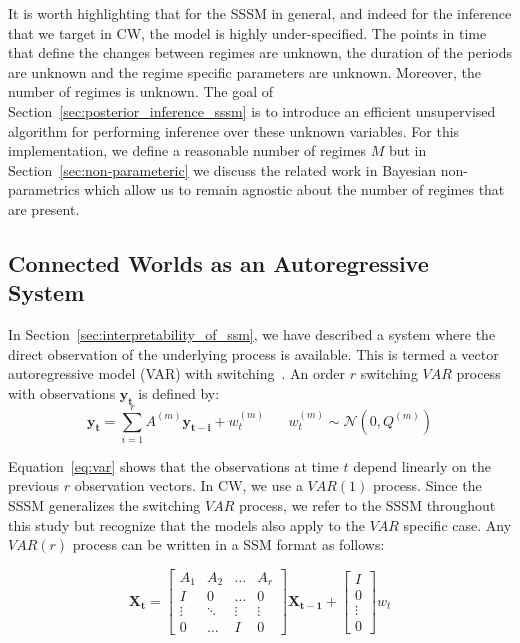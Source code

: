 It is worth highlighting that for the SSSM in general, and indeed for the inference that we target in CW, the model is highly under-specified. The points in time that define the changes between regimes are unknown, the duration of the periods are unknown and the regime specific parameters are unknown. Moreover, the number of regimes is unknown. The goal of Section~\ref{sec:posterior_inference_sssm} is to introduce an efficient unsupervised algorithm for performing inference over these unknown variables. For this implementation, we define a reasonable number of regimes $M$ but in Section~\ref{sec:non-parameteric} we discuss the related work in Bayesian non-parametrics which allow us to remain agnostic about the number of regimes that are present.

\subsection{Connected Worlds as an Autoregressive System}
In Section~\ref{sec:interpretability_of_ssm}, we have described a system where the direct observation of the underlying process is available. This is termed a vector autoregressive model (VAR) with switching~\citep{fox2009nonparametric, shumway2000time,kim1994dynamic}. An order $r$ switching $VAR$ process with observations $\mathbf{y_t}$ is defined by:
\begin{equation}\label{eq:var}
  \mathbf{y_t} = \sum\limits_{i=1}^{r} A^{(m)}\mathbf{y_{t-i}} + w^{(m)}_t \hspace{20pt} w^{(m)}_t \sim \mathcal{N}(0, Q^{(m)})
\end{equation}

Equation~\ref{eq:var} shows that the observations at time $t$ depend linearly on the previous $r$ observation vectors. In CW, we use a $VAR(1)$ process. Since the SSSM generalizes the switching $VAR$ process, we refer to the SSSM throughout this study but recognize that the models also apply to the $VAR$ specific case. Any $VAR(r)$ process can be written in a SSM format as follows:

\begin{equation}\label{eq:ssm_rep_of_var_state}
  \mathbf{X_t} =
  \begin{bmatrix}
      A_{1}       & A_{2} &  \dots & A_{r} \\
      I           & 0     &  \dots & 0 \\
      \vdots      & \ddots&  \vdots& \vdots \\
      0           & \hdots&   I    & 0
    \end{bmatrix} \mathbf{X_{t-1}} +
  \begin{bmatrix}
    I \\
    0 \\
    \vdots \\
    0
  \end{bmatrix} w_t
\end{equation}


